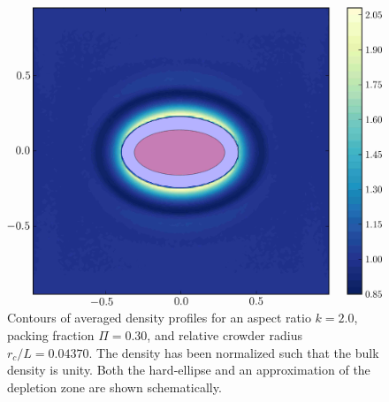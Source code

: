 \begin{figure}
\includegraphics[width=\figurewidthSINGLE]{tex/entropic_flow_paper/FIG1_EDIT.jpg}
\caption{Contours of averaged density profiles for an aspect ratio $k=2.0$, packing fraction $\Pi=0.30$, and relative crowder radius $r_c/L=0.04370$. The density has been normalized such that the bulk density is unity. Both the hard-ellipse and an approximation of the depletion zone are shown schematically.}
\label{fig:density_plot}
\end{figure}

